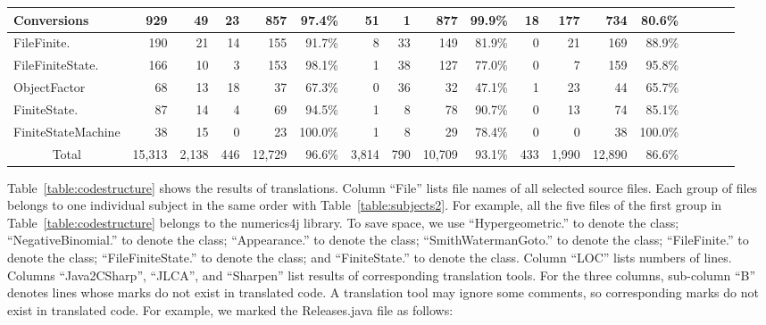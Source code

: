 \begin{table*}[t]
\begin{SmallOut}
\begin {tabular} {|l|r|r|r|r|r|r|r|r|r|r|r|r|r|r|r|r|r|}
\hline
  Conversions                  & 929   & 49  & 23 & 857 & 97.4\% & 51  & 1  & 877  & 99.9\% & 18  & 177& 734  & 80.6\%\\
\hline\hline
FileFinite.                    & 190   & 21  & 14 & 155 & 91.7\% & 8   & 33 & 149  & 81.9\% & 0   & 21 & 169  & 88.9\%\\
\hline
FileFiniteState.               & 166  & 10  & 3  & 153 & 98.1\% & 1   & 38 & 127   & 77.0\% & 0   & 7  & 159  & 95.8\%\\
\hline
  ObjectFactor                 & 68   & 13  & 18 & 37  & 67.3\% & 0   & 36  & 32   & 47.1\% & 1  & 23  & 44   & 65.7\%\\
\hline
  FiniteState.                 & 87   & 14  & 4  & 69  & 94.5\% & 1   & 8   & 78   & 90.7\% & 0  & 13  & 74   & 85.1\%\\
\hline
  FiniteStateMachine           & 38    & 15 & 0  & 23 & 100.0\% & 1   & 8   & 29   & 78.4\% & 0  & 0   & 38   & 100.0\%\\
\hline\hline
\multicolumn{1}{|c|}{Total}    &15,313 &2,138&446&12,729& 96.6\% & 3,814& 790&10,709 & 93.1\% & 433& 1,990 &12,890 & 86.6\%\\
\hline
\end{tabular}%
 \label{table:codestructure}
\end{SmallOut}%
\end{table*}

Table~\ref{table:codestructure} shows the results of translations. Column ``File'' lists file names of all selected source files. Each group of files belongs to one individual subject in the same order with Table~\ref{table:subjects2}. For example, all the five files of the first group in Table~\ref{table:codestructure} belongs to the numerics4j library. To save space, we use ``Hypergeometric.'' to denote the  class; ``NegativeBinomial.'' to denote the  class; ``Appearance.'' to denote the  class; ``SmithWatermanGoto.'' to denote the  class; ``FileFinite.'' to denote the  class; ``FileFiniteState.'' to denote the  class; and ``FiniteState.'' to denote the  class. Column ``LOC'' lists numbers of lines. Columns ``Java2CSharp'', ``JLCA'', and ``Sharpen'' list results of corresponding translation tools. For the three columns, sub-column ``B'' denotes lines whose marks do not exist in translated code. A translation tool may ignore some comments, so corresponding marks do not exist in translated code. For example, we marked the Releases.java file as follows:

